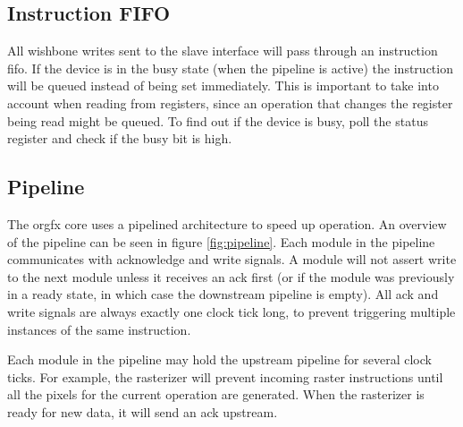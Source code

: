 \documentclass[10pt,a4paper]{article}
\begin{document}
\subsection{Instruction FIFO}
All wishbone writes sent to the slave interface will pass through an instruction fifo. If the device is in the busy state (when the pipeline is active) the instruction will be queued instead of being set immediately. This is important to take into account when reading from registers, since an operation that changes the register being read might be queued. To find out if the device is busy, poll the status register and check if the busy bit is high.

\subsection{Pipeline}
The orgfx core uses a pipelined architecture to speed up operation. An overview of the pipeline can be seen in figure \ref{fig:pipeline}. Each module in the pipeline communicates with acknowledge and write signals. A module will not assert write to the next module unless it receives an ack first (or if the module was previously in a ready state, in which case the downstream pipeline is empty). All ack and write signals are always exactly one clock tick long, to prevent triggering multiple instances of the same instruction.

Each module in the pipeline may hold the upstream pipeline for several clock ticks. For example, the rasterizer will prevent incoming raster instructions until all the pixels for the current operation are generated. When the rasterizer is ready for new data, it will send an ack upstream.

\end{document}
